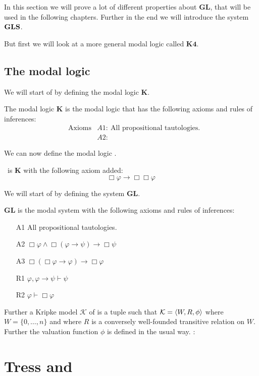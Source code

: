 \documentclass[../main.tex]{subfiles}
\begin{document}
In this section we will prove a lot of different properties about \textbf{GL},
that will be used in the following chapters. 
Further in the end we will introduce the system $\text{\textbf{GLS}}$.

But first we will look at a more general modal logic called $\textbf{K4}$.

\subsection{The modal logic \Kfour}

We will start of by defining the modal logic \textbf{K}.

\begin{defi}
	The modal logic \textbf{K} is the modal logic that has the following
	axioms and rules of inferences:
	\begin{align*}
		&\text{Axioms} &A1:\ \text{All propositional tautologies.}\\
		& &A2:
	\end{align*}
\end{defi}
We can now define the modal logic \Kfour.

\begin{defi}
	\Kfour\ is \textbf{K} with the following axiom added:
	\[\Box\varphi\rightarrow\Box\Box\varphi\]
\end{defi}
We will start of by defining the system \textbf{GL}. 

\begin{defi} \textbf{GL} is the modal system with the following axioms and
	rules of inferences:
	\begin{enumerate}
		\item [A1] All propositional tautologies.
		\item [A2]
			$\Box\varphi\wedge\Box(\varphi\rightarrow\psi)\rightarrow\Box\psi$
		\item [A3]
			$\Box(\Box\varphi\rightarrow\varphi)\rightarrow\Box\varphi$
		\item [R1] $\varphi,\varphi\rightarrow\psi\vdash\psi$
		\item [R2] $\varphi\vdash\Box\varphi$
	\end{enumerate}
\end{defi}
Further a Kripke model $\mathcal{K}$ of \GL is a tuple such that
$\mathcal{K}=\langle W,R,\phi\rangle$ where $W=\{0,\ldots,n\}$ and where $R$ is a
conversely well-founded transitive relation on $W$. Further the valuation
function $\phi$ is defined in the usual way.
:
\section{Tress and \GL}
\end{document}
